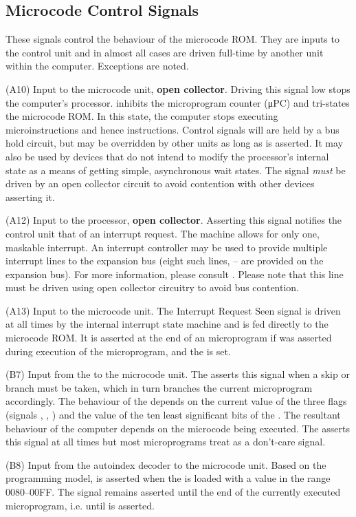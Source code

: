 \subsection{Microcode Control Signals}

These signals control the behaviour of the microcode ROM. They are
inputs to the control unit and in almost all cases are driven
full-time by another unit within the computer. Exceptions are noted.

\begin{description}
\item{\bfseries \HALT} (A10) Input to the microcode unit, \textbf{open
  collector}. Driving this signal low stops the computer's
  processor. \HALT{} inhibits the microprogram counter (\textsf{μPC})
  and tri-states the microcode ROM. In this state, the computer stops
  executing microinstructions and hence instructions. Control signals
  will are held by a bus hold circuit, but may be overridden by other
  units as long as \HALT{} is asserted. It may also be used by devices
  that do not intend to modify the processor's internal state as a
  means of getting simple, asynchronous wait states. The \HALT{}
  signal {\em must\/} be driven by an open collector circuit to avoid
  contention with other devices asserting it.
\item{\bfseries \IRQ} (A12) Input to the processor, \textbf{open
  collector}. Asserting this signal notifies the control unit that of
  an interrupt request. The machine allows for only one, maskable
  interrupt. An interrupt controller may be used to provide multiple
  interrupt lines to the expansion bus (eight such lines,
  – are provided on the expansion bus). For more
  information, please consult . Please note that
  this line must be driven using open collector circuitry to avoid bus
  contention.
\item{\bfseries \IRQS} (A13) Input to the microcode unit. The Interrupt
  Request Seen signal is driven at all times by the internal interrupt
  state machine and is fed directly to the microcode ROM. It is
  asserted at the end of an microprogram if \IRQ{} was asserted during
  execution of the microprogram, and the \Ireg{} is set.
\item{\bfseries \SKIP} (B7) Input from the \SBU{} to the microcode unit. The
  \SBU{} asserts this signal when a skip or branch must be taken,
  which in turn branches the current microprogram accordingly. The
  behaviour of the \SBU{} depends on the current value of the three
  flags (signals \FL, \FZERO, \FNEG) and the value of the ten least
  significant bits of the \IR. The resultant behaviour of the computer
  depends on the microcode being executed.  The \SBU{} asserts this
  signal at all times but most microprograms treat \SKIP{} as a
  don't-care signal.
\item{\bfseries \AINDEX} (B8) Input from the autoindex decoder to the
  microcode unit. Based on the programming model, \AINDEX is asserted
  when the \MAR{} is loaded with a value in the range 0080–00FF. The
  signal remains asserted until the end of the currently executed
  microprogram, i.e. until \END{} is asserted.
\end{description}

